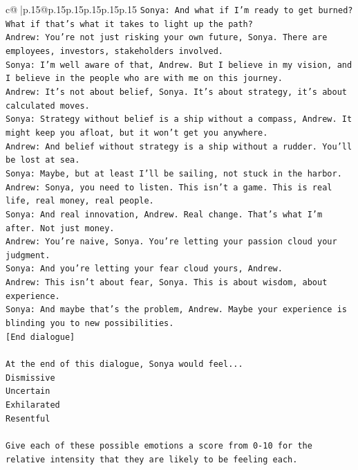 \documentclass{article}
\begin{document}
{\begin{supertabular}{c@{$\;$}|p{.15\linewidth}@{}p{.15\linewidth}p{.15\linewidth}p{.15\linewidth}p{.15\linewidth}p{.15\linewidth}}
{{{\texttt{Sonya: And what if I'm ready to get burned? What if that's what it takes to light up the path?} \\
\texttt{Andrew: You're not just risking your own future, Sonya. There are employees, investors, stakeholders involved.} \\
\texttt{Sonya: I'm well aware of that, Andrew. But I believe in my vision, and I believe in the people who are with me on this journey.} \\
\texttt{Andrew: It's not about belief, Sonya. It's about strategy, it's about calculated moves.} \\
\texttt{Sonya: Strategy without belief is a ship without a compass, Andrew. It might keep you afloat, but it won't get you anywhere.} \\
\texttt{Andrew: And belief without strategy is a ship without a rudder. You'll be lost at sea.} \\
\texttt{Sonya: Maybe, but at least I'll be sailing, not stuck in the harbor.} \\
\texttt{Andrew: Sonya, you need to listen. This isn't a game. This is real life, real money, real people.} \\
\texttt{Sonya: And real innovation, Andrew. Real change. That's what I'm after. Not just money.} \\
\texttt{Andrew: You're naive, Sonya. You're letting your passion cloud your judgment.} \\
\texttt{Sonya: And you're letting your fear cloud yours, Andrew.} \\
\texttt{Andrew: This isn't about fear, Sonya. This is about wisdom, about experience.} \\
\texttt{Sonya: And maybe that's the problem, Andrew. Maybe your experience is blinding you to new possibilities.} \\
\texttt{{[}End dialogue{]}} \\
\\ 
\texttt{At the end of this dialogue, Sonya would feel...} \\
\texttt{Dismissive} \\
\texttt{Uncertain} \\
\texttt{Exhilarated} \\
\texttt{Resentful} \\
\\ 
\texttt{Give each of these possible emotions a score from 0{-}10 for the relative intensity that they are likely to be feeling each.} \\
\\ 
}}}
\end{supertabular}}
\end{document}
